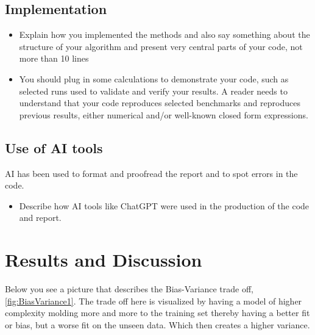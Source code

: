 \documentclass[amssymb,twocolumn,aps]{revtex4}
\begin{document}
\subsection{Implementation}

\begin{itemize}
    \item Explain how you implemented the methods and also say something about the structure of your algorithm and present very central parts of your code, not more than 10 lines
    \item You should plug in some calculations to demonstrate your code, such as selected runs used to validate and verify your results. A reader needs to understand that your code reproduces selected benchmarks and reproduces previous results, either numerical and/or well-known closed form expressions.
\end{itemize}

\subsection{Use of AI tools}
	AI has been used to format and proofread the report and to spot errors in the code.
\begin{itemize}
    \item Describe how AI tools like ChatGPT were used in the production of the code and report.
\end{itemize}

\newpage

\section{Results and Discussion}\label{section:results} 
Below you see a picture that describes the Bias-Variance trade off, \ref{fig:BiasVariance1}. 
The trade off here is visualized by having a model of higher complexity molding more and more to the training set thereby having a better fit or bias, but a worse fit on the unseen data.
Which then creates a higher variance.

\end{document}
